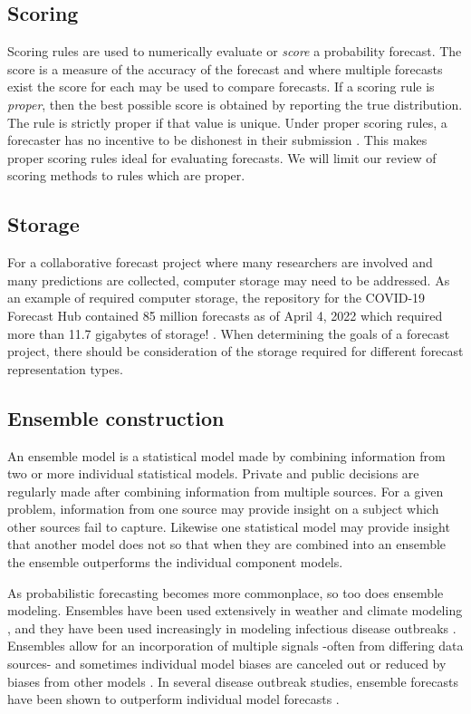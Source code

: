 \documentclass[11pt,notitlepage]{isuthesis}
\begin{document}
\subsection{Scoring}
Scoring rules are used to numerically evaluate or \emph{score} a probability 
forecast. 
The
score is a measure of the accuracy of the forecast and where multiple forecasts
exist the score for each may be used to compare forecasts. If a scoring rule 
is \emph{proper}, then the best possible score is obtained by reporting the true 
distribution. The rule is strictly proper if that value is unique. 
Under proper
scoring rules, a forecaster has no incentive to be dishonest in their 
submission \cite[]{gneiting2007strictly}. This makes proper scoring rules ideal
for evaluating forecasts. We will limit our review of scoring methods to rules
which are proper.

\subsection{Storage}
For a collaborative forecast project where many researchers are involved and 
many predictions are collected, computer storage may need to be addressed. 
As an example of required computer storage, the 
repository for the
COVID-19 Forecast Hub contained 85 million forecasts as of 
April 4, 2022 which required more than 11.7 gigabytes of storage!
\cite[]{covidgithub}.
When determining the goals of a forecast project, there should be consideration 
of the storage required for different forecast representation types.

\subsection{Ensemble construction}
An ensemble model is a statistical model made by combining information from
two or more individual statistical models. Private and public decisions are 
regularly made after combining information from multiple sources. For a given
problem, information from one source may provide insight on a subject which 
other
sources fail to capture. Likewise one statistical model may provide insight
that another model does not so that when they are combined into an ensemble the 
ensemble outperforms the individual component models.

As probabilistic forecasting becomes more commonplace, so too does ensemble 
modeling. Ensembles have been used extensively in weather and
climate modeling \cite[]{baran2018combining}, 
and they have been used increasingly in modeling infectious disease outbreaks
\cite[]{yamana2016superensemble}. 
Ensembles allow for an incorporation of multiple signals -often from differing
data sources- and sometimes individual model biases are 
canceled
out or reduced by biases from other models \cite[see references
therein]{reich2019accuracy}. 
In several disease outbreak studies, ensemble forecasts have been 
shown to outperform individual model forecasts
\cite[see
references therein]{ray2020ensemble, cramer2021evaluation}.
\end{document}
